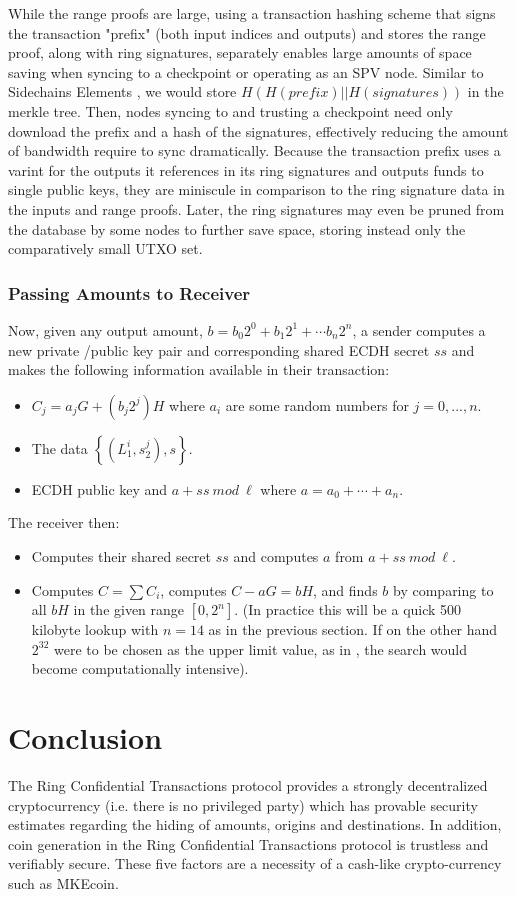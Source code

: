 \documentclass[12pt,oneside,english]{amsart}
\numberwithin{equation}{section}
\numberwithin{figure}{section}
\theoremstyle{plain}
\theoremstyle{plain}
\theoremstyle{remark}
\theoremstyle{plain}
\theoremstyle{remark}
\theoremstyle{remark}
\theoremstyle{plain}
\theoremstyle{definition}
\begin{document}
While the range proofs are large, using a transaction hashing scheme that signs the transaction "prefix" (both input indices and outputs) and stores the range proof, along with ring signatures, separately enables large amounts of space saving when syncing to a checkpoint or operating as an SPV node. Similar to Sidechains Elements \cite{El}, we would store 
$H(H(prefix) || H(signatures))$ in the merkle tree. Then, nodes syncing to and trusting a checkpoint need only download the prefix and a hash of the signatures, effectively reducing the amount of bandwidth require to sync dramatically. Because the transaction prefix uses a varint for the outputs it references in its ring signatures and outputs funds to single public keys, they are miniscule in comparison to the ring signature data in the inputs and range proofs. Later, the ring signatures may even be pruned from the database by some nodes to further save space, storing instead only the comparatively small UTXO set.
\subsubsection{Passing Amounts to Receiver}
Now, given any output amount, $b = b_0 2^0 + b_1 2^1 + \cdots b_n 2^n $, a sender computes a new private /public key pair and corresponding shared ECDH secret $ss$ and makes the following information available in their transaction:
\begin{itemize}
 \item $C_j = a_j G + (b_j 2^j) H$ where $a_i$ are some random numbers for $j=0,...,n$.
 \item The data $\left\{(L_1^i, s_2^j),s\right\}$. 
 \item ECDH public key and $a + ss\ mod\ \ell$ where $a = a_0 + \cdots + a_n$. 
\end{itemize}
The receiver then:
\begin{itemize}
 \item Computes their shared secret $ss$ and computes $a$ from $a + ss\ mod\ \ell$. 
 \item Computes $C = \sum C_i$, computes $C - aG = bH$, and finds $b$ by comparing to all $bH$ in the given range $[0, 2^n]$. (In practice this will be a quick 500 kilobyte lookup with $n = 14$ as in the previous section. If on the other hand $2^{32}$ were to be chosen as the upper limit value, as in \cite{GM}, the search would become computationally intensive). 
\end{itemize}


\section{Conclusion}
The Ring Confidential Transactions protocol provides a strongly decentralized cryptocurrency (i.e. there is no privileged party) which has provable security estimates regarding the hiding of amounts, origins and destinations. In addition, coin generation in the Ring Confidential Transactions protocol is trustless and verifiably secure. These five factors are a necessity of a cash-like crypto-currency such as MKEcoin. 
\end{document}
